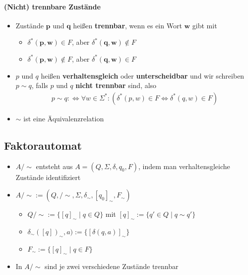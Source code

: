 \documentclass{scrartcl}
\begin{document}
\paragraph{(Nicht) trennbare Zustände}

\begin{itemize}
	\item Zustände $\mathbf{p}$ und $\mathbf{q}$ heißen \textbf{trennbar}, wenn es ein Wort $\mathbf{w}$ gibt mit
	\begin{itemize}
		\item $\delta^*(\mathbf{p},\mathbf{w}) \in F$, aber $\delta^*(\mathbf{q},\mathbf{w}) \not \in F$
		\item $\delta^*(\mathbf{p},\mathbf{w}) \not \in F$, aber $\delta^*(\mathbf{q},\mathbf{w}) \in F$
	\end{itemize}
	\item $p$ und $q$ heißen \textbf{verhaltensgleich} oder \textbf{unterscheidbar} und wir schreiben $p \sim q$, falls $p$ und $q$ \textbf{nicht trennbar} sind, also
	\begin{align*}
		p \sim q :\iff \forall w \in \Sigma^*: (\delta^*(p,w) \in F \iff \delta^*(q,w) \in F)
	\end{align*}
	\item $\sim$ ist eine Äquivalenzrelation
\end{itemize}

\subsection{Faktorautomat}

\begin{itemize}
	\item $A/\sim$ entsteht aus $A = (Q,\Sigma,\delta,q_0,F)$, indem man verhaltensgleiche Zustände identifiziert
	\item $A/\sim := (Q, /\sim, \Sigma, \delta_\sim, [q_0]_\sim, F_\sim)$
	\begin{itemize}
		\item $Q/\sim := \{ [q]_\sim \mid q \in Q \}$ mit $[q]_\sim := \{ q' \in Q \mid q \sim q' \}$
		\item $\delta_\sim([q])_\sim, a) := \{ [\delta(q,a)]_\sim \}$
		\item $F_\sim := \{ [q]_\sim \mid q \in F \}$
	\end{itemize}
	\item In $A/\sim$ sind je zwei verschiedene Zustände trennbar
\end{itemize}
\end{document}
